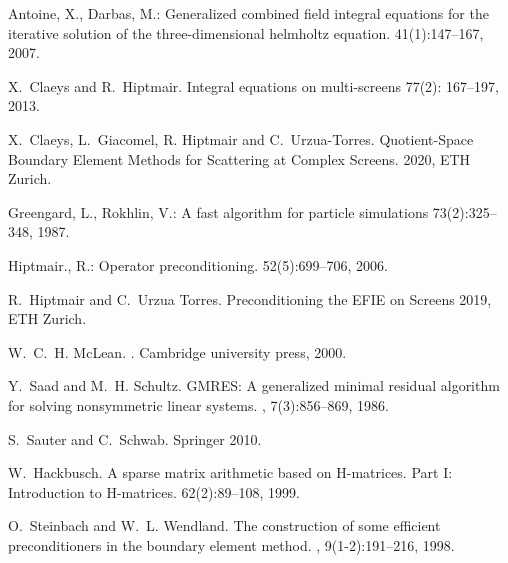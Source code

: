 \documentclass[]{article}
\begin{document}
\begin{thebibliography}{0}
	
	Antoine, X., Darbas, M.:
	\newblock Generalized combined field integral equations for the iterative
	solution of the three-dimensional helmholtz equation.
	41(1):147--167, 2007.
	
	X.~Claeys and R.~Hiptmair.
	\newblock Integral equations on multi-screens
	 77(2): 167--197, 2013.
	
	X.~Claeys, L.~Giacomel, R. Hiptmair and C.~Urzua-Torres.
	\newblock Quotient-Space Boundary Element Methods for Scattering at Complex Screens.
	 2020, ETH Zurich.
	
	
	Greengard, L., Rokhlin, V.:
	\newblock A fast algorithm for particle simulations
	 73(2):325--348, 1987.
	
	Hiptmair., R.:
	\newblock Operator preconditioning.
	 52(5):699--706, 2006.
	
	
	R.~Hiptmair and C.~Urzua Torres.
	Preconditioning the EFIE on Screens
	 2019, ETH Zurich.
	
	W.~C.~H. McLean.
	.
	\newblock Cambridge university press, 2000.
	
	Y.~Saad and M.~H. Schultz.
	\newblock GMRES: A generalized minimal residual algorithm for solving
	nonsymmetric linear systems.
	,
	7(3):856--869, 1986.
	
	S.~Sauter and C.~Schwab.
	\newblock Springer 2010.
	
	
	W.~Hackbusch.
	\newblock A sparse matrix arithmetic based on H-matrices. Part I: Introduction to H-matrices.
	 62(2):89--108, 1999.
	
	O.~Steinbach and W.~L. Wendland.
	\newblock The construction of some efficient preconditioners in the boundary
	element method.
	, 9(1-2):191--216, 1998.
	
	

	
	
\end{thebibliography}
\end{document}
